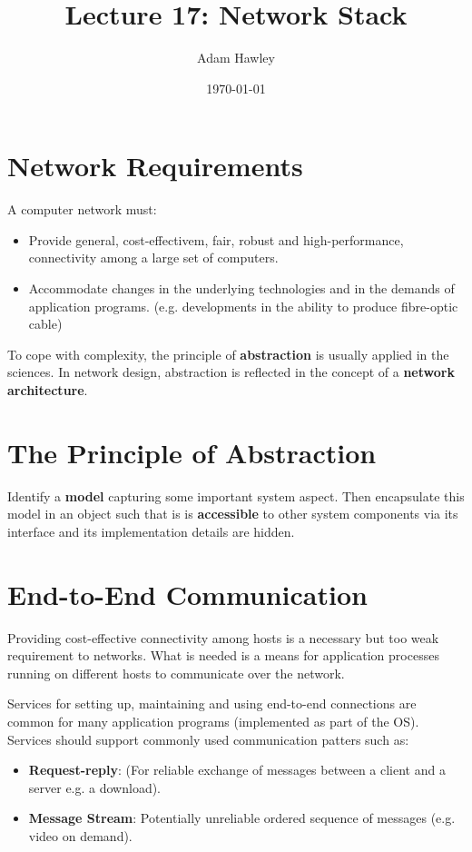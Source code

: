 \documentclass[11pt]{article}
\author{Adam Hawley}
\date{\today}
\title{Lecture 17: Network Stack}
\begin{document}
\maketitle
\tableofcontents


\section{Network Requirements}
\label{sec:orgba87a1e}
A computer network must:
\begin{itemize}
\item Provide general, cost-effectivem, fair, robust and high-performance, connectivity among a large set of computers.
\item Accommodate changes in the underlying technologies and in the demands of application programs. (e.g. developments in the ability to produce fibre-optic cable)
\end{itemize}
To cope with complexity, the principle of \textbf{abstraction} is usually applied in the sciences.
In network design, abstraction is reflected in the concept of a \textbf{network architecture}.

\section{The Principle of Abstraction}
\label{sec:orgc94e795}
Identify a \textbf{model} capturing some important system aspect.
Then encapsulate this model in an object such that is is \textbf{accessible} to other system components via its interface and its implementation details are hidden.

\section{End-to-End Communication}
\label{sec:orgdffa641}
Providing cost-effective connectivity among hosts is a necessary but too weak requirement to networks.
What is needed is a means for application processes running on different hosts to communicate over the network.

Services for setting up, maintaining and using end-to-end connections are common for many application programs (implemented as part of the OS).
Services should support commonly used communication patters such as:
\begin{itemize}
\item \textbf{Request-reply}: (For reliable exchange of messages between a client and a server e.g. a download).
\item \textbf{Message Stream}: Potentially unreliable ordered sequence of messages (e.g. video on demand).
\end{itemize}
\end{document}
